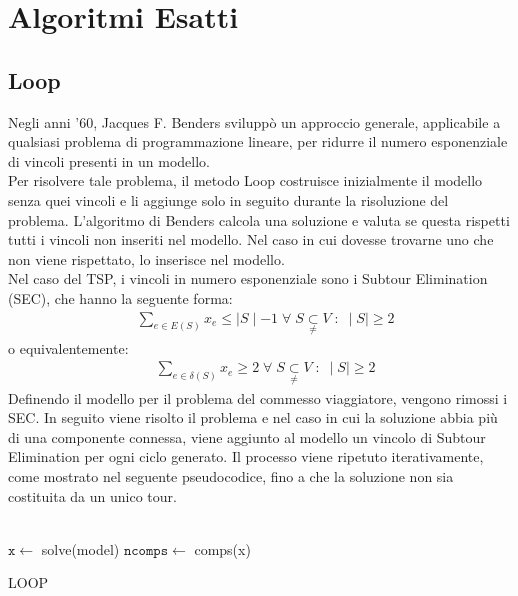 \section{Algoritmi Esatti}
\subsection{Loop}
Negli anni '60, Jacques F. Benders sviluppò un approccio generale, applicabile a qualsiasi problema di programmazione lineare, per ridurre il numero esponenziale di vincoli presenti in un modello.\\
Per risolvere tale problema, il metodo Loop costruisce inizialmente il modello senza quei vincoli e li aggiunge solo in seguito durante la risoluzione del problema. L'algoritmo di Benders calcola una soluzione e valuta se questa rispetti tutti i vincoli non inseriti nel modello. Nel caso in cui dovesse trovarne uno che non viene rispettato, lo inserisce nel modello.\\ 
Nel caso del TSP, i vincoli in numero esponenziale sono i Subtour Elimination (SEC), che hanno la seguente forma:
\begin{align}
&\underset{e\in E(S)}\sum{x_{e}} \leq \mid S\mid - 1\;\forall\;S\underset{\neq}{\subset}V\; : \; \mid S\mid\geq 2
\end{align}
o equivalentemente:
\begin{align}
&\underset{e\in \delta(S)}\sum{x_{e}}\geq 2\;\forall\;S\underset{\neq}{\subset}V\; : \; \mid S\mid\geq 2
\end{align}
Definendo il modello per il problema del commesso viaggiatore, vengono rimossi i SEC. In seguito viene risolto il problema e nel caso in cui la soluzione abbia più di una componente connessa, viene aggiunto al modello un vincolo di Subtour Elimination per ogni ciclo generato. Il processo viene ripetuto iterativamente, come mostrato nel seguente pseudocodice, fino a che la soluzione non sia costituita da un unico tour.\\\\
\begin{algorithm}[H]
\DontPrintSemicolon
{}
\BlankLine 
 $\mathtt{x} \gets$ solve(model)\;
 $\mathtt{ncomps} \gets$ comps(x)\;
 \BlankLine 
 \caption{LOOP}
\end{algorithm}
